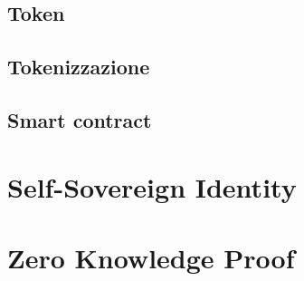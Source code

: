 \subsection{Token}\label{sec:tecnologie-blockchain-avanziate-token}
\subsection{Tokenizzazione}\label{sec:tecnologie-blockchain-avanziate-tokenizzazione}
\subsection{Smart contract}\label{sec:tecnologie-blockchain-avanziate-smart-contract}

\section{Self-Sovereign Identity}\label{sec:self-sovereign-identity}

\section{Zero Knowledge Proof}\label{sec:zero-knowledge-proof}
